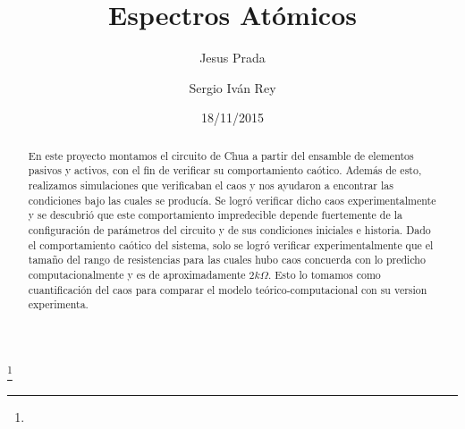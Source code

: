 \documentclass[%
 reprint,
 amsmath,amssymb,
 aps,
]{revtex4-1}
\begin{document}

\title{Espectros Atómicos}%
\thanks{}%

\author{Jesus Prada}
\author{Sergio Iv\'an Rey}%
%

\date{18/11/2015}%

\begin{abstract}
En este proyecto montamos el circuito de Chua a partir del ensamble de elementos pasivos y activos, con el fin de verificar su comportamiento caótico. Además de esto, realizamos simulaciones que verificaban el caos y nos ayudaron a encontrar las condiciones bajo las cuales se producía. Se logró verificar dicho caos experimentalmente y se descubrió que este comportamiento impredecible depende fuertemente de la configuración de parámetros del circuito y de sus condiciones iniciales e historia. Dado el comportamiento caótico del sistema, solo se logró verificar experimentalmente que el tamaño del rango de resistencias para las cuales hubo caos concuerda con lo predicho computacionalmente y es de aproximadamente $2k\Omega$. Esto lo tomamos como cuantificación del caos para comparar el modelo teórico-computacional con su version experimenta.\\
\end{abstract}


\maketitle

\end{document}

